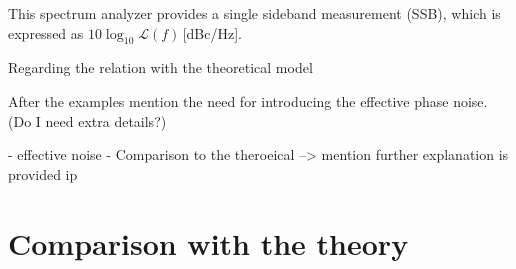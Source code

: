 This spectrum analyzer provides a single sideband measurement (SSB), which is expressed as $10\log_{10}\mathcal{L}(f)$\,[dBc/Hz]. 



Regarding the relation with the theoretical model 



 After the examples mention the need for introducing the effective phase noise. (Do I need extra details?)
 

 - effective noise
 - Comparison to the theroeical --> mention further explanation is provided ip 

 \section{Comparison with the theory}\label{sec:MD2018_vs_theory}